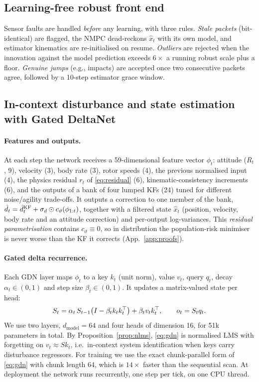 \subsection{Learning-free robust front end}
Sensor faults are handled \emph{before} any learning, with three rules. \emph{Stale packets} (bit-identical) are flagged, the NMPC dead-reckons $\hat x_t$ with its own model, and estimator kinematics are re-initialised on resume. \emph{Outliers} are rejected when the innovation against the model prediction exceeds $6\times$ a running robust scale plus a floor. \emph{Genuine jumps} (e.g., impacts) are accepted once two consecutive packets agree, followed by a 10-step estimator grace window.

\subsection{In-context disturbance and state estimation with Gated DeltaNet}
\label{sec:gdn}
\paragraph{Features and outputs.}
At each step the network receives a 59-dimensional feature vector $\phi_t$: attitude ($R_t$, 9), velocity (3), body rate (3), rotor speeds (4), the previous normalised input (4), the physics residual $r_t$ of \eqref{eq:residual} (6), kinematic-consistency increments (6), and the outputs of a bank of four lumped KFs (24) tuned for different noise/agility trade-offs.
It outputs a correction to one member of the bank, $\hat d_t = \hat d^{\mathrm{KF}}_t + \sigma_d\odot c_\vartheta(\phi_{1:t})$, together with a filtered state $\hat x_t$ (position, velocity, body rate and an attitude correction) and per-output log-variances.
This \emph{residual parametrisation} contains $c_\vartheta\equiv 0$, so in distribution the population-risk minimiser is never worse than the KF it corrects (App.~\ref{app:proofs}).

\paragraph{Gated delta recurrence.}
Each GDN layer \citep{yang2025gated} maps $\phi_t$ to a key $k_t$ (unit norm), value $v_t$, query $q_t$, decay $\alpha_t\in(0,1)$ and step size $\beta_t\in(0,1)$. It updates a matrix-valued state per head:
\begin{equation}
  S_t = \alpha_t\, S_{t-1}\big(I-\beta_t k_t k_t^{\top}\big)+\beta_t v_t k_t^{\top},\qquad o_t = S_t q_t .
  \label{eq:gdn}
\end{equation}
We use two layers, $d_{\mathrm{model}}=64$ and four heads of dimension 16, for 51k parameters in total.
By Proposition~\ref{prop:nlms}, \eqref{eq:gdn} is normalised LMS with forgetting on $v_t\approx Sk_t$, i.e.\ in-context system identification when keys carry disturbance regressors.
For training we use the exact chunk-parallel form of \eqref{eq:gdn} \citep{yang2024parallelizing} with chunk length 64, which is $14\times$ faster than the sequential scan. At deployment the network runs recurrently, one step per tick, on one CPU thread.

